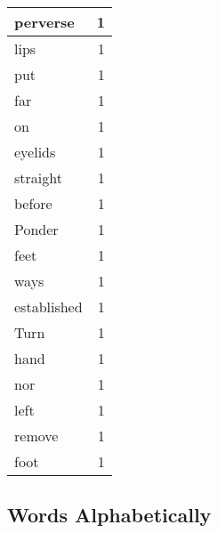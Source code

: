 \begin{center}
\begin{longtable}{l|r}
perverse & 1\\ \hline 
lips & 1\\ \hline 
put & 1\\ \hline 
far & 1\\ \hline 
on & 1\\ \hline 
eyelids & 1\\ \hline 
straight & 1\\ \hline 
before & 1\\ \hline 
Ponder & 1\\ \hline 
feet & 1\\ \hline 
ways & 1\\ \hline 
established & 1\\ \hline 
Turn & 1\\ \hline 
hand & 1\\ \hline 
nor & 1\\ \hline 
left & 1\\ \hline 
remove & 1\\ \hline 
foot & 1\\ \hline 
\end{longtable}  
\end{center}  


  
\normalsize  

  
  


\subsection{Words Alphabetically}

